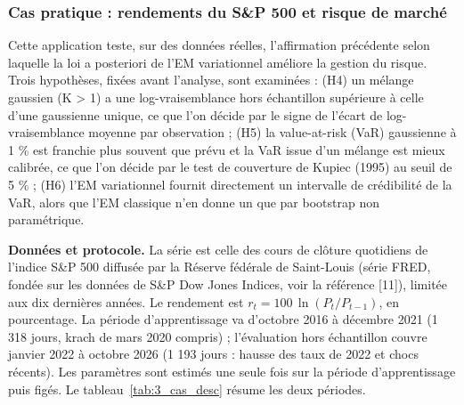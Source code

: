 \subsubsection{Cas pratique : rendements du S\&P 500 et risque de marché}
Cette application teste, sur des données réelles, l'affirmation précédente selon laquelle la loi a posteriori de l'EM variationnel améliore la gestion du risque. Trois hypothèses, fixées avant l'analyse, sont examinées : (H4) un mélange gaussien (K > 1) a une log-vraisemblance hors échantillon supérieure à celle d'une gaussienne unique, ce que l'on décide par le signe de l'écart de log-vraisemblance moyenne par observation ; (H5) la value-at-risk (VaR) gaussienne à 1 \% est franchie plus souvent que prévu et la VaR issue d'un mélange est mieux calibrée, ce que l'on décide par le test de couverture de Kupiec (1995) au seuil de 5 \% ; (H6) l'EM variationnel fournit directement un intervalle de crédibilité de la VaR, alors que l'EM classique n'en donne un que par bootstrap non paramétrique.

\textbf{Données et protocole. }La série est celle des cours de clôture quotidiens de l'indice S\&P 500 diffusée par la Réserve fédérale de Saint-Louis (série FRED, fondée sur les données de S\&P Dow Jones Indices, voir la référence [11]), limitée aux dix dernières années. Le rendement est $r_{t} = 100\,\ln (P_{t}/P_{t-1})$, en pourcentage. La période d'apprentissage va d'octobre 2016 à décembre 2021 (1 318 jours, krach de mars 2020 compris) ; l'évaluation hors échantillon couvre janvier 2022 à octobre 2026 (1 193 jours : hausse des taux de 2022 et chocs récents). Les paramètres sont estimés une seule fois sur la période d'apprentissage puis figés. Le tableau~\ref{tab:3_cas_desc} résume les deux périodes.

